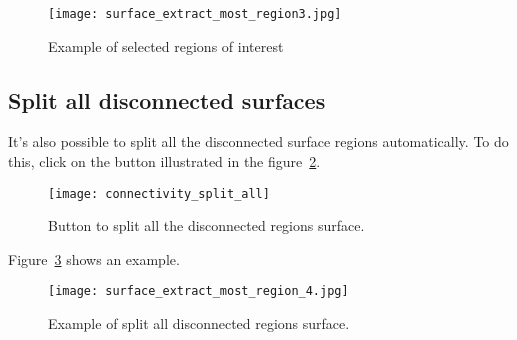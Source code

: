 \begin{figure}[!htb]
\centering
\texttt{[image: surface\_extract\_most\_region3.jpg]}
\caption{Example of selected regions of interest}
\label{fig:extract_most_region3}
\end{figure}


\subsection{Split all disconnected surfaces}

It's also possible to split all the disconnected surface regions automatically. To do this, click on the button illustrated in the figure~\ref{fig:connectivity_split_all}.

\begin{figure}[!htb]
\centering
\texttt{[image: connectivity\_split\_all]}
\caption{Button to split all the disconnected regions surface.}
\label{fig:connectivity_split_all}
\end{figure}

Figure~\ref{fig:extrac_most_region_4} shows an example.

\begin{figure}[!htb]
\centering
\texttt{[image: surface\_extract\_most\_region\_4.jpg]}
\caption{Example of split all disconnected regions surface.}
\label{fig:extrac_most_region_4}
\end{figure}

